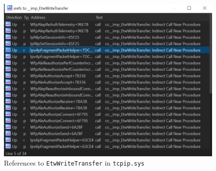\documentclass{report}
\begin{document}
\begin{figure}[H]
	\centering
    \includegraphics[width=\textwidth]{etwwritetransfer-refs.png}
    \caption{References to \texttt{EtwWriteTransfer} in \texttt{tcpip.sys}}
    \label{fig:detection:etw:etwwritetransfer-refs}
\end{figure}
\end{document}
